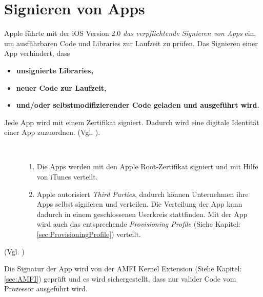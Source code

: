 \section{Signieren von Apps}
\label{sec:SigningProcess}

Apple führte mit der iOS Version 2.0 \textit{\glqq das verpflichtende Signieren von Apps\grqq{}} ein, um ausführbaren Code und Libraries zur Laufzeit zu prüfen. Das Signieren einer App verhindert, dass 
\begin{itemize}
    \item \textbf{unsignierte Libraries,
}    \item \textbf{neuer Code zur Laufzeit,} 
    \item \textbf{und/oder selbstmodifizierender Code geladen und ausgeführt wird.}
\end{itemize}
Jede App wird mit einem Zertifikat signiert. Dadurch wird eine digitale Identität einer App zuzuordnen. (Vgl. \cite{Cert[2], Cert[3]}).
\begin{description}
    \item[\parbox{\textwidth} {Eine App kann auf zwei Arten signiert werden}]~\par
   \begin{enumerate}
        \item Die Apps werden mit den Apple Root-Zertifikat signiert und mit Hilfe von iTunes verteilt. 
        
        \item Apple autorisiert \textit{\glqq Third Parties\grqq}, dadurch können Unternehmen ihre Apps selbst signieren und verteilen. Die Verteilung der App kann dadurch in einem geschlossenen Userkreis stattfinden. Mit der App wird auch das entsprechende \textit{\glqq Provisioning Profile\grqq{}} (Siehe Kapitel: \ref{sec:ProvisioningProfile}) verteilt.
    \end{enumerate} 
\end{description} 
(Vgl. \cite{Sign[1], Sign[2], Sign[3], Sign[4], Sign[5], ROP[1]}) \par 
Die Signatur der App wird von der AMFI Kernel Extension (Siehe Kapitel: \ref{sec:AMFI}) geprüft und es wird sichergestellt, dass nur valider Code vom Prozessor ausgeführt wird.    
 
